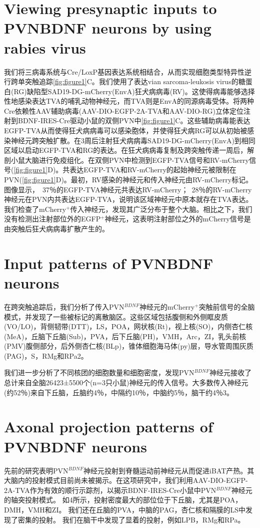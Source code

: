 \section{Viewing presynaptic inputs to PVNBDNF neurons by using rabies virus}
我们将三病毒系统与Cre/LoxP基因表达系统\citep{wickersham2007monosynaptic}相结合，从而实现细胞类型特异性逆行跨单突触追踪\figurename{\ref{fig:figure1}C}。我们使用了表达vian sarcoma-leukosis virus的糖蛋白(RG)缺陷型SAD19-DG-mCherry(EnvA)狂犬病病毒(RV)。这使得病毒能够选择性地感染表达TVA的哺乳动物神经元，而TVA则是EnvA的同源病毒受体。将两种Cre依赖性AAV辅助病毒(AAV-DIO-EGFP-2A-TVA和AAV-DIO-RG)立体定位注射到BDNF-IRES-Cre驱动小鼠的双侧PVN中\figurename{\ref{fig:figure1}C}。这些辅助病毒能表达EGFP-TVA从而使得狂犬病病毒可以感染胞体，并使得狂犬病RG可以从初始被感染神经元跨突触扩散。在3周后注射狂犬病病毒SAD19-DG-mCherry(EnvA)到相同区域以启动EGFP-TVA和RG的表达。在狂犬病病毒复制及跨突触传递一周后，解剖小鼠大脑进行免疫组化。在双侧PVN中检测到EGFP-TVA信号和RV-mCherry信号(\figurename{\ref{fig:figure1}D})。共表达EGFP-TVA和RV-mCherry的起始神经元被限制在PVN(\figurename{\ref{fig:figure1}D})。最初，RV感染的神经元和传入神经元由RV-mCherry标记。图像显示，~37％的EGFP-TVA神经元共表达RV-mCherry；~28％的RV-mCherry神经元在PVN内共表达EGFP-TVA，说明该区域神经元中原本就存在TVA表达。我们检查了mCherry$^{+}$传入神经元，发现其广泛分布于整个大脑。相比之下，我们没有检测出注射部位外的EGFP$^{+}$神经元，这表明注射部位之外的mCherry信号是由突触后狂犬病病毒扩散产生的。

\section{Input patterns of PVNBDNF neurons}
在跨突触追踪后，我们分析了传入PVN$^{BDNF}$神经元的mCherry$^{+}$突触前信号的全脑模式，并发现了一些被标记的离散脑区。这些区域包括腹侧和外侧眶皮质(VO/LO)，背侧韧带(DTT)，LS，POA，网状核(Rt)，视上核(SO)，内侧杏仁核(MeA)，丘脑下丘脑(Sub)，PVA，后下丘脑(PH)，VMH，Arc，ZI，乳头前核(PMV)腹侧部分，后外侧杏仁核(BLp)，锥体细胞海马体(py)层，导水管周围灰质(PAG)，S，RMg和RPa\figurename{2}。

我们进一步分析了不同核团的细胞数量和细胞密度，发现PVN$^{BDNF}$神经元接收了总计来自全脑26423±5500个(n=3只小鼠)神经元的传入信号。大多数传入神经元(约52％)来自下丘脑，丘脑约4％，中隔约10％，中脑约5％，脑干约4％\figurename{3}。

\section{Axonal projection patterns of PVNBDNF neurons}
先前的研究表明PVN$^{BDNF}$神经元投射到脊髓运动前神经元从而促进iBAT产热\citep{an2015discrete}。其大脑内的投射模式目前尚未被揭示。在这项研究中，我们利用AAV-DIO-EGFP-2A-TVA作为有效的顺行示踪剂，以揭示BDNF-IRES-Cre小鼠中PVN$^{BDNF}$神经元的轴突投射模式。 如\figurename{4}所示，投射密度最大的部位位于下丘脑，尤其是POA，DMH，VMH和ZI。 我们还在丘脑的PVA，中脑的PAG，杏仁核和隔膜的LS中发现了密集的投射。 我们在脑干中发现了显着的投射，例如LPB，RMg和RPa。

